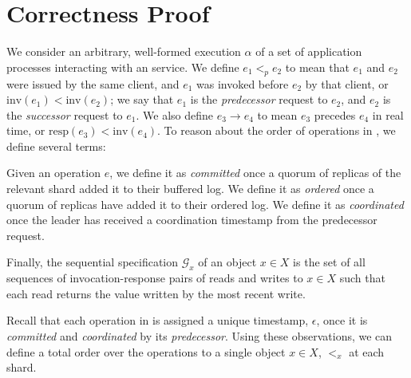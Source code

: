 \section{Correctness Proof}
\label{sec:correctness}
We consider an arbitrary, well-formed execution $\alpha$ of a set of application processes interacting with an \sys{} service. We define $e_1 <_p e_2$ to mean that $e_1$ and $e_2$ were issued by the same client, and $e_1$ was invoked before $e_2$ by that client, or $\text{inv}(e_1) < \text{inv}(e_2)$; we say that $e_1$ is the \textit{predecessor} request to $e_2$, and $e_2$ is the \textit{successor} request to $e_1$. We also define $e_3 \rightarrow e_4$ to mean $e_3$ precedes $e_4$ in real time, or $\text{resp}(e_3) < \text{inv}(e_4)$. To reason about the order of operations in \sys{}, we define several terms:

Given an operation $e$, we define it as \textit{committed} once a quorum of replicas of the relevant shard added it to their buffered log. We define it as \textit{ordered} once a quorum of replicas have added it to their ordered log. We define it as \textit{coordinated} once the leader has received a coordination timestamp from the predecessor request.

Finally, the sequential specification $\mathcal{G}_x$ of an object $x \in X$ is the set of all sequences of invocation-response pairs of reads and writes to $x \in X$ such that each read returns the value written by the most recent write.

Recall that each operation in \sys{} is assigned a unique timestamp, $\epsilon$, once it is \textit{committed} and \textit{coordinated} by its \textit{predecessor}. Using these observations, we can define a total order over the operations to a single object $x \in X$, $<_x$ at each shard.

